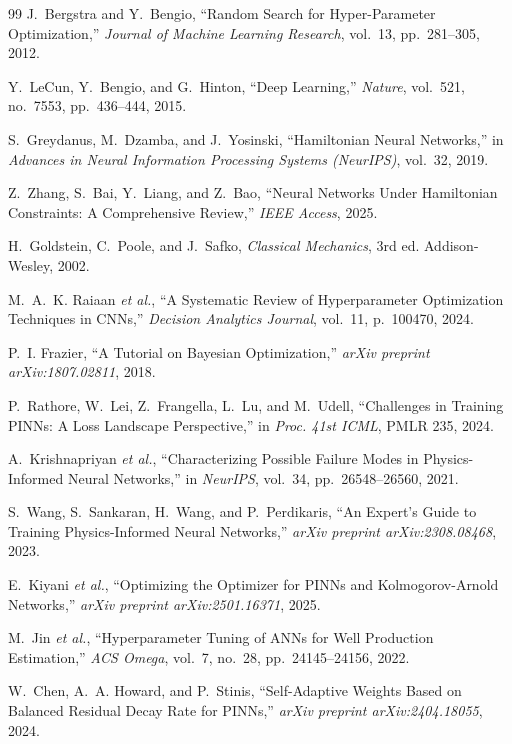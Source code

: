 \documentclass[12pt,a4paper]{article}
\begin{document}
\begin{thebibliography}{99}
J.~Bergstra and Y.~Bengio,
``Random Search for Hyper-Parameter Optimization,''
\textit{Journal of Machine Learning Research}, vol.~13,
pp.~281--305, 2012.

Y.~LeCun, Y.~Bengio, and G.~Hinton,
``Deep Learning,''
\textit{Nature}, vol.~521, no.~7553, pp.~436--444, 2015.

S.~Greydanus, M.~Dzamba, and J.~Yosinski,
``Hamiltonian Neural Networks,''
in \textit{Advances in Neural Information Processing Systems (NeurIPS)},
vol.~32, 2019.

Z.~Zhang, S.~Bai, Y.~Liang, and Z.~Bao,
``Neural Networks Under Hamiltonian Constraints: A Comprehensive Review,''
\textit{IEEE Access}, 2025.

H.~Goldstein, C.~Poole, and J.~Safko,
\textit{Classical Mechanics}, 3rd ed.
Addison-Wesley, 2002.

M.~A.~K. Raiaan \textit{et al.},
``A Systematic Review of Hyperparameter Optimization Techniques in CNNs,''
\textit{Decision Analytics Journal}, vol.~11, p.~100470, 2024.

P.~I. Frazier,
``A Tutorial on Bayesian Optimization,''
\textit{arXiv preprint arXiv:1807.02811}, 2018.

P.~Rathore, W.~Lei, Z.~Frangella, L.~Lu, and M.~Udell,
``Challenges in Training PINNs: A Loss Landscape Perspective,''
in \textit{Proc. 41st ICML}, PMLR 235, 2024.

A.~Krishnapriyan \textit{et al.},
``Characterizing Possible Failure Modes in Physics-Informed Neural Networks,''
in \textit{NeurIPS}, vol.~34, pp.~26548--26560, 2021.

S.~Wang, S.~Sankaran, H.~Wang, and P.~Perdikaris,
``An Expert's Guide to Training Physics-Informed Neural Networks,''
\textit{arXiv preprint arXiv:2308.08468}, 2023.

E.~Kiyani \textit{et al.},
``Optimizing the Optimizer for PINNs and Kolmogorov-Arnold Networks,''
\textit{arXiv preprint arXiv:2501.16371}, 2025.

M.~Jin \textit{et al.},
``Hyperparameter Tuning of ANNs for Well Production Estimation,''
\textit{ACS Omega}, vol.~7, no.~28, pp.~24145--24156, 2022.

W.~Chen, A.~A. Howard, and P.~Stinis,
``Self-Adaptive Weights Based on Balanced Residual Decay Rate for PINNs,''
\textit{arXiv preprint arXiv:2404.18055}, 2024.


\end{thebibliography}
\end{document}
